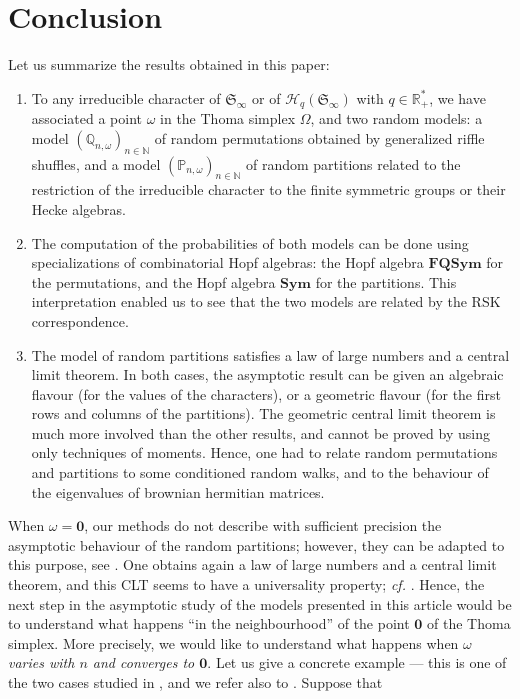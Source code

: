 \documentclass[smallextended,nospthms]{svjour3}
\theoremstyle{remark}
\newcommand{\N}{\mathbb{N}}
\newcommand{\R}{\mathbb{R}}
\newcommand{\hecke}{\mathscr{H}}
\newcommand{\sym}{\mathfrak{S}}
\newcommand{\Sym}{\mathbf{Sym}}
\newcommand{\FQSym}{\mathbf{FQSym}}
\newcommand{\proba}{\mathbb{P}}
\newcommand{\qproba}{\mathbb{Q}}
\begin{document}
\section*{Conclusion}
\noindent Let us summarize the results obtained in this paper:\vspace{2mm}
\begin{enumerate}
\item To any irreducible character of $\sym_{\infty}$ or of $\hecke_{q}(\sym_{\infty})$ with $q \in \R_{+}^{*}$, we have associated a point $\omega$ in the Thoma simplex $\Omega$, and two random models: a model $(\qproba_{n,\omega})_{n\in \N}$ of random permutations obtained by generalized riffle shuffles, and a model $(\proba_{n,\omega})_{n \in \N}$ of random partitions related to the restriction of the irreducible character to the finite symmetric groups or their Hecke algebras.\vspace{2mm}
\item The computation of the probabilities of both models can be done using specializations of combinatorial Hopf algebras: the Hopf algebra $\FQSym$ for the permutations, and the Hopf algebra $\Sym$ for the partitions. This interpretation enabled us to see that the two models are related by the RSK correspondence.\vspace{2mm}
\item The model of random partitions satisfies a law of large numbers and a central limit theorem. In both cases, the asymptotic result can be given an algebraic flavour (for the values of the characters), or a geometric flavour (for the first rows and columns of the partitions). The geometric central limit theorem is much more involved than the other results, and cannot be proved by using only techniques of moments. Hence, one had to relate random permutations and partitions to some conditioned random walks, and to the behaviour of the eigenvalues of brownian hermitian matrices.\vspace{2mm}
\end{enumerate}
When $\omega=\mathbf{0}$, our methods do not describe with sufficient precision the asymptotic behaviour of the random partitions; however, they can be adapted to this purpose, see \cite{IO02}. One obtains again a law of large numbers and a central limit theorem, and this CLT seems to have a universality property; \emph{cf.} \cite{Mel11}. Hence, the next step in the asymptotic study of the models presented in this article would be to understand what happens ``in the neighbourhood'' of the point $\mathbf{0}$ of the Thoma simplex. More precisely, we would like to understand what happens when $\omega$ \emph{varies with $n$ and converges to $\mathbf{0}$}. Let us give a concrete example --- this is one of the two cases studied in \cite{Mel11}, and we refer also to \cite{Bia01}. Suppose that
\end{document}
